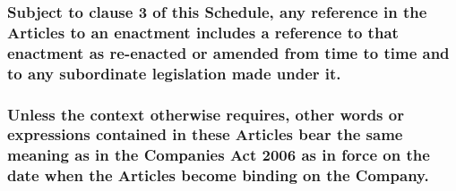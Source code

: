 \documentclass[12pt]{article}
\begin{document}
\subsubsection*{Subject to clause 3 of this Schedule, any reference in the Articles to an enactment includes a reference to that enactment as re-enacted or amended from time to time and to any subordinate legislation made under it.}
\subsubsection*{Unless the context otherwise requires, other words or expressions contained in these Articles bear the same meaning as in the Companies Act 2006 as in force on the date when the Articles become binding on the Company.}
\end{document}
